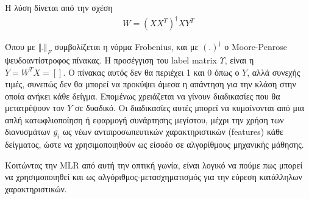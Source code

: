 \documentclass[11pt,a4paper,english,greek,twoside]{../Thesis}
\begin{document}
\par H λύση δίνεται από την σχέση
\begin{align}
W=(XX^T)^{\dagger} XY^T
\label{eqMLR4}
\end{align}
\par Όπου με $\Vert .\Vert_F$ συμβολίζεται η νόρμα Frobenius, και με $(.)^{\dagger}$ ο Moore-Penrose ψευδοαντίστροφος πίνακας. Η προσέγγιση του label matrix $Υ$, είναι η $\overline{Y}=W^TX=[]$. Ο πίνακας αυτός δεν θα περιέχει 1 και 0 όπως ο $Y$, αλλά συνεχής τιμές, συνεπώς δεν θα μπορεί να προκύψει άμεσα η απάντηση για την κλάση στην οποία ανήκει κάθε δείγμα. Επομένως χρειάζεται να γίνουν διαδικασίες που θα μετατρέψουν τον $\overline{Y}$ σε δυαδικό. Οι διαδικασίες αυτές μπορεί να κυμαίνονται από μια απλή κατωφλιοποίηση  ή εφαρμογή συνάρτησης μεγίστου, μέχρι την χρήση των διανυσμάτων $\overline{y_i}$ ως νέων αντιπροσωπευτικών χαρακτηριστικών (features) κάθε δείγματος, ώστε να χρησιμοποιηθούν ως είσοδο σε αλγορίθμους μηχανικής μάθησης.
\par Κοιτώντας την MLR από αυτή την οπτική γωνία, είναι λογικό να πούμε πως μπορεί να χρησιμοποιηθεί και ως αλγόριθμος-μετασχηματισμός για την εύρεση κατάλληλων χαρακτηριστικών.
\end{document}
